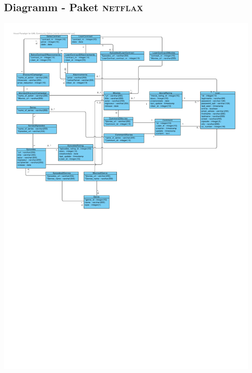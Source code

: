 \documentclass[11pt,a4paper,DIV=9]{scrartcl}
\begin{document}
  \subsection{Diagramm - Paket \textsc{netflax}}
    \includegraphics[angle=90,trim=0cm 0cm 1.1cm 1cm, clip=true, scale=1]{Diagramme/Paket_Netflax}
\end{document}
